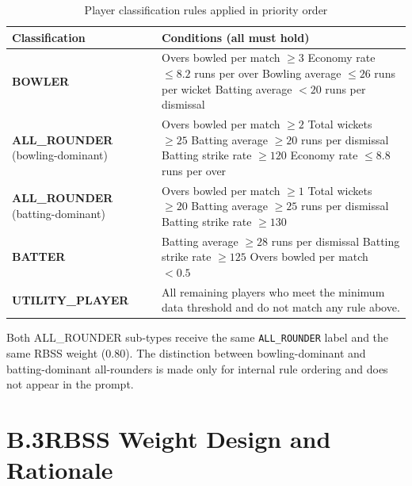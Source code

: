 \begin{table}[ht]
\centering
\caption{Player classification rules applied in priority order}
\label{tab:classification_rules_full}
\begin{tabular}{p{4cm} p{9.5cm}}
\hline
\textbf{Classification} & \textbf{Conditions (all must hold)} \\
\hline
\textbf{BOWLER} &
  Overs bowled per match $\geq 3$ \newline
  Economy rate $\leq 8.2$ runs per over \newline
  Bowling average $\leq 26$ runs per wicket \newline
  Batting average $< 20$ runs per dismissal \\
\hline
\textbf{ALL\_ROUNDER} \newline (bowling-dominant) &
  Overs bowled per match $\geq 2$ \newline
  Total wickets $\geq 25$ \newline
  Batting average $\geq 20$ runs per dismissal \newline
  Batting strike rate $\geq 120$ \newline
  Economy rate $\leq 8.8$ runs per over \\
\hline
\textbf{ALL\_ROUNDER} \newline (batting-dominant) &
  Overs bowled per match $\geq 1$ \newline
  Total wickets $\geq 20$ \newline
  Batting average $\geq 25$ runs per dismissal \newline
  Batting strike rate $\geq 130$ \\
\hline
\textbf{BATTER} &
  Batting average $\geq 28$ runs per dismissal \newline
  Batting strike rate $\geq 125$ \newline
  Overs bowled per match $< 0.5$ \\
\hline
\textbf{UTILITY\_PLAYER} &
  All remaining players who meet the minimum data threshold and do not match any rule above. \\
\hline
\end{tabular}
\end{table}

\noindent Both ALL\_ROUNDER sub-types receive the same \texttt{ALL\_ROUNDER} label and the same RBSS weight (0.80). The distinction between bowling-dominant and batting-dominant all-rounders is made only for internal rule ordering and does not appear in the prompt.

\section*{B.3\quad RBSS Weight Design and Rationale}

